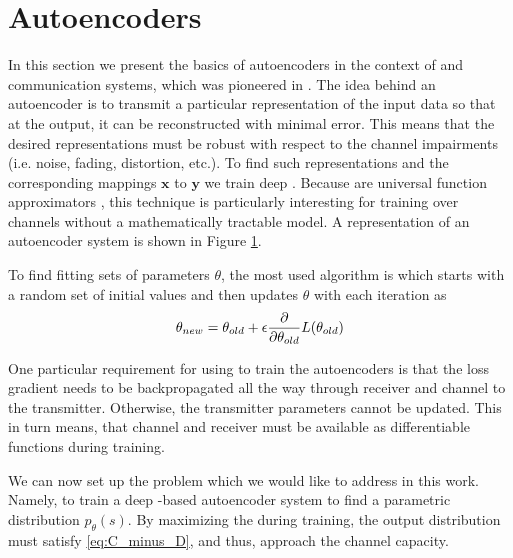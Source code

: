 	
\section{Autoencoders}
In this section we present the basics of autoencoders in the context of  and communication systems, which was pioneered in \cite{O'Shea}. The idea behind an autoencoder is to transmit a particular representation of the input data so that at the output, it can be reconstructed with minimal error. This means that the desired representations must be robust with respect to the channel impairments (i.e. noise, fading, distortion, etc.). To find such representations and the corresponding mappings $\textbf{x}$ to $\textbf{y}$ we train deep . Because  are universal function approximators \cite{HORNIK1989359}, this technique is particularly interesting for training over channels without a mathematically tractable model. A representation of an autoencoder system is shown in Figure \ref{}.

To find fitting sets of parameters \textbf{$\theta$}, the most used algorithm is  which starts with a random set of initial values and then updates \textbf{$\theta$} with each iteration as
\begin{align}
	\theta_{new} = \theta_{old} + \epsilon \pdv{\theta_{old}} L(\theta_{old})
\end{align}

One particular requirement for using  to train the autoencoders is that the loss gradient needs to be backpropagated
all the way through receiver and channel to the transmitter. Otherwise, the transmitter parameters cannot be updated. This in turn means, that channel and receiver must be available as differentiable functions during training.

We can now set up the problem which we would like to address in this work. Namely, to train a deep -based autoencoder system to find a parametric distribution $p_{\theta}(s)$. By maximizing the  during training, the output distribution must satisfy \ref{eq:C_minus_D}, and thus, approach the channel capacity.